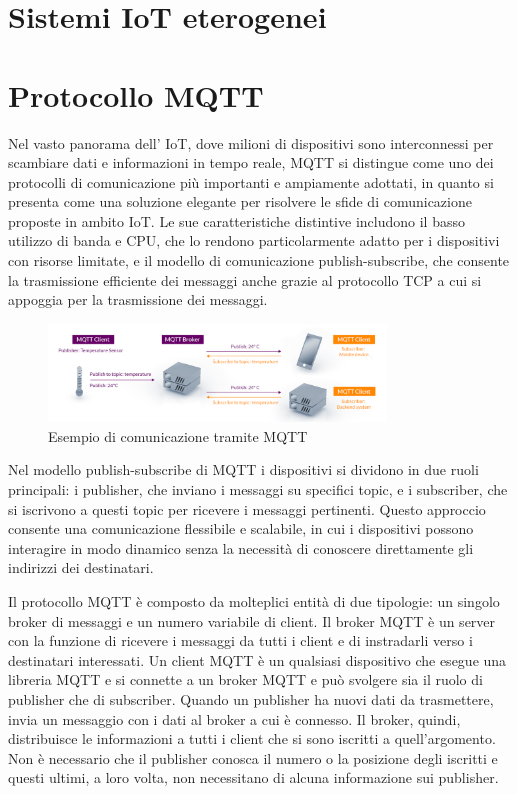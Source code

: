 \documentclass[12pt,a4paper,openright,twoside]{book}
\begin{document}
\section{Sistemi IoT eterogenei}


\section{Protocollo MQTT}

Nel vasto panorama dell' \acf{IoT}, dove milioni di dispositivi sono interconnessi per scambiare dati e informazioni in tempo reale, \acf{MQTT} 
si distingue come uno dei protocolli di comunicazione più importanti e ampiamente adottati, in quanto si presenta come una soluzione elegante per risolvere le sfide di 
comunicazione proposte in ambito \ac{IoT}. Le sue caratteristiche distintive includono il basso utilizzo di banda e CPU, che lo rendono particolarmente adatto per i 
dispositivi con risorse limitate, e il modello di comunicazione publish-subscribe, che consente la trasmissione efficiente dei messaggi anche grazie al protocollo 
\ac{TCP} a cui si appoggia per la trasmissione dei messaggi.

\begin{figure}[H]
    \centering
    \includegraphics[width=0.8\textwidth]{figures/mqtt-example.png}
    \caption{Esempio di comunicazione tramite MQTT}
    \label{fig:mqtt-example}
\end{figure}

Nel modello publish-subscribe di \ac{MQTT} i dispositivi si dividono in due ruoli principali:
 i publisher, che inviano i messaggi su specifici topic, e i subscriber, che si iscrivono a questi topic per ricevere i messaggi pertinenti. 
 Questo approccio consente una comunicazione flessibile e scalabile, in cui i dispositivi possono interagire in modo dinamico senza la necessità
 di conoscere direttamente gli indirizzi dei destinatari.

Il protocollo \ac{MQTT} è composto da molteplici entità di due tipologie: un singolo broker di messaggi e un numero variabile di client. Il broker \ac{MQTT} è un server 
con la funzione di ricevere i messaggi da tutti i client e di instradarli verso i destinatari interessati. Un client \ac{MQTT} è un qualsiasi dispositivo che esegue una libreria 
\ac{MQTT} e si connette a un broker \ac{MQTT} e può svolgere sia il ruolo di publisher che di subscriber. Quando un publisher ha nuovi dati da trasmettere, 
invia un messaggio con i dati al broker a cui è connesso. Il broker, quindi, distribuisce le informazioni a tutti i client che si sono iscritti a quell’argomento. 
Non è necessario che il publisher conosca il numero o la posizione degli iscritti e questi ultimi, a loro volta, non necessitano di alcuna informazione sui publisher.
\end{document}
